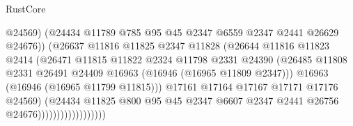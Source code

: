 \begin{lexlean}{RustCore}
\begin{coremodule}
                                        @24569)
                                      (@24434
                                        @11789
                                        @785
                                        @95
                                        @45
                                        @2347
                                        @6559
                                        @2347
                                        @2441
                                        @26629
                                        @24676))
                                    (@26637
                                      @11816
                                      @11825
                                      @2347
                                      @11828
                                      (@26644
                                        @11816
                                        @11823
                                        @2414
                                        (@26471
                                          @11815
                                          @11822
                                          @2324
                                          @11798
                                          @2331
                                          @24390
                                          (@26485
                                            @11808
                                            @2331
                                            @26491
                                            @24409
                                            @16963
                                            (@16946 (@16965 @11809 @2347)))
                                          @16963
                                          (@16946 (@16965 @11799 @11815)))
                                        @17161
                                        @17164
                                        @17167
                                        @17171
                                        @17176
                                        @24569)
                                      (@24434
                                        @11825
                                        @800
                                        @95
                                        @45
                                        @2347
                                        @6607
                                        @2347
                                        @2441
                                        @26756
                                        @24676))))))))))))))))))

\end{coremodule}
\end{lexlean}
